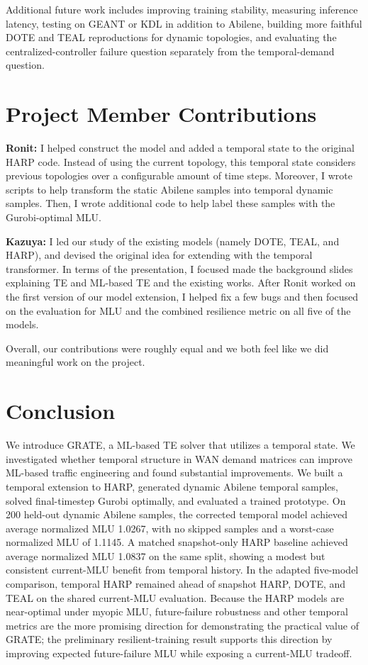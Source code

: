 \documentclass[letterpaper,twocolumn,10pt]{article}
\begin{document}
Additional future work includes improving training stability, measuring inference latency, testing on GEANT or KDL in addition to Abilene, building more faithful DOTE and TEAL reproductions for dynamic topologies, and evaluating the centralized-controller failure question separately from the temporal-demand question.

\section{Project Member Contributions}

\textbf{Ronit:} I helped construct the model and added a temporal state to the original HARP code. Instead of using the current topology, this temporal state considers previous topologies over a configurable amount of time steps. Moreover, I wrote scripts to help transform the static Abilene samples into temporal dynamic samples. Then, I wrote additional code to help label these samples with the Gurobi-optimal MLU. 

\medbreak \noindent \textbf{Kazuya:} I led our study of the existing models (namely DOTE, TEAL, and HARP), and devised the original idea for extending with the temporal transformer. In terms of the presentation, I focused made the background slides explaining TE and ML-based TE and the existing works. After Ronit worked on the first version of our model extension, I helped fix a few bugs and then focused on the evaluation for MLU and the combined resilience metric on all five of the models.

\medbreak \noindent Overall, our contributions were roughly equal and we both feel like we did meaningful work on the project.

\section{Conclusion}

We introduce GRATE, a ML-based TE solver that utilizes a temporal state. We investigated whether temporal structure in WAN demand matrices can improve ML-based traffic engineering and found substantial improvements. We built a temporal extension to HARP, generated dynamic Abilene temporal samples, solved final-timestep Gurobi optimally, and evaluated a trained prototype. On 200 held-out dynamic Abilene samples, the corrected temporal model achieved average normalized MLU 1.0267, with no skipped samples and a worst-case normalized MLU of 1.1145. A matched snapshot-only HARP baseline achieved average normalized MLU 1.0837 on the same split, showing a modest but consistent current-MLU benefit from temporal history. In the adapted five-model comparison, temporal HARP remained ahead of snapshot HARP, DOTE, and TEAL on the shared current-MLU evaluation. Because the HARP models are near-optimal under myopic MLU, future-failure robustness and other temporal metrics are the more promising direction for demonstrating the practical value of GRATE; the preliminary resilient-training result supports this direction by improving expected future-failure MLU while exposing a current-MLU tradeoff.

{\footnotesize 
}
\end{document}
